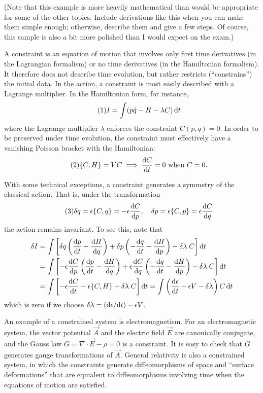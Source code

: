 (Note that this example is more heavily mathematical than would be
appropriate for some of the other topics. Include derivations like this
when you can make them simple enough; otherwise, describe them and give
a few steps. Of course, this sample is also a bit more polished than I
would expect on the exam.)

A constraint is an equation of motion that involves only first time
derivatives (in the Lagrangian formalism) or no time derivatives (in the
Hamiltonian formalism). It therefore does not describe time evolution,
but rather restricts (``constrains'') the initial data. In the action, a
constraint is most easily described with a Lagrange multiplier. In the
Hamiltonian form, for instance,
\begin{equation*}\tag{1}
I = \int(p\dot{q}-H-\lambda C)\,\mathrm{d} t
\end{equation*}
where the Lagrange multiplier $\lambda$ enforces the constraint
$C(p,q)=0$. In order to be preserved under time evolution, the
constraint must effectively have a vanishing Poisson bracket with the
Hamiltonian:
\begin{equation*}\tag{2}
\{C,H\}=VC \implies \frac{\mathrm{d} C}{\mathrm{d} t}=0\mbox{ when }C=0.
\end{equation*}

With some technical exceptions, a constraint generates a symmetry of the
classical action. That is, under the transformation
\begin{equation*}\tag{3}
  \delta q=\epsilon\{C,q\}=-\epsilon\frac{\mathrm{d} C}{\mathrm{d} p},\quad
  \delta p=\epsilon\{C,p\}=\epsilon\frac{\mathrm{d} C}{\mathrm{d} q}
\end{equation*}
the action remains invariant. To see this, note that
\begin{align*}
\delta I
&= \int\left[\delta q\left(\frac{\mathrm{d} p}{\mathrm{d} t}-\frac{\mathrm{d} H}{\mathrm{d} q}\right)
  + \delta p\left(-\frac{\mathrm{d} q}{\mathrm{d} t}-\frac{\mathrm{d} H}{\mathrm{d} p}\right) -
 \delta\lambda\;C\right]\mathrm{d} t\\
&= \int\left[-\epsilon\frac{\mathrm{d} C}{\mathrm{d} p}\left(\frac{\mathrm{d} p}{\mathrm{d} t}-\frac{\mathrm{d} H}{\mathrm{d} q}\right)
  + \epsilon\frac{\mathrm{d} C}{\mathrm{d} q}\left(-\frac{\mathrm{d} q}{\mathrm{d} t}-\frac{\mathrm{d} H}{\mathrm{d} p}\right) -
 \delta\lambda\;C\right]\mathrm{d} t\\
&= \int\left[-\epsilon\frac{\mathrm{d} C}{\mathrm{d} t} - \epsilon\{C,H\} + \delta\lambda\;C\right]\mathrm{d} t
= \int\left(\frac{\mathrm{d}\epsilon}{\mathrm{d} t}-\epsilon V -
\delta\lambda\right)C\,\mathrm{d} t
\end{align*}
which is zero if we choose $\delta\lambda = (\mathrm{d}\epsilon/\mathrm{d} t) - \epsilon V$.

An example of a constrained system is electromagnetism. For an
electromagnetic system, the vector potential $\vec{A}$ and the electric
field $\vec{E}$ are canonically conjugate, and the Gauss law
$G=\nabla\cdot\vec{E}-\rho=0$ is a constraint. It is easy to check that
$G$ generates gauge transformations of $\vec{A}$. General relativity is
also a constrained system, in which the constraints generate
diffeomorphisms of space and ``surface deformations'' that are equialent
to diffeomorphisms involving time when the equations of motion are satisfied.
